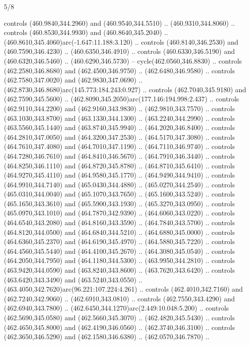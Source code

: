 \begin{flagdescription}{5/8}
\begin{scope}[xshift=0.5\flaglength,yshift=0.5\flagwidth,scale=\flagwidth/475.63]
\begin{scope}[y=0.8pt, x=0.8pt, yscale=-1, xscale=1,shift={(-450,-300)}]
\begin{scope}[cm={{1.0,0.0,0.0,1.0,(-0.0002,0.12556)}},cm={{1.0,0.0,0.0,1.0,(0.00179,0.0)}}]
\begin{scope}[cm={{1.01375,0.0,0.0,1.01375,(-5.36379,-4.94943)}}]
  controls (460.9840,344.2960) and (460.9540,344.5510) .. (460.9310,344.8060) ..
  controls (460.8530,344.9930) and (460.8640,345.2040) ..
  (460.8610,345.4060)arc(-1.647:11.188:3.120) .. controls (460.8140,346.2530)
  and (460.7590,346.4230) .. (460.6350,346.4910) .. controls (460.6330,346.5190)
  and (460.6320,346.5460) .. (460.6290,346.5730) -- cycle(462.0560,346.8830) ..
  controls (462.2580,346.8680) and (462.4500,346.9750) .. (462.6480,346.9580) ..
  controls (462.7580,347.0020) and (462.9830,347.0690) ..
  (462.8730,346.8680)arc(145.773:184.243:0.927) .. controls (462.7040,345.9180)
  and (462.7590,345.5600) .. (462.8090,345.2050)arc(177.146:194.998:2.437) ..
  controls (462.9110,344.2200) and (462.9160,343.9830) .. (462.9810,343.7570) ..
  controls (463.1030,343.8700) and (463.1330,344.1300) .. (463.2240,344.2990) ..
  controls (463.5560,345.1440) and (463.8740,345.9940) .. (464.2020,346.8400) ..
  controls (464.2810,347.0050) and (464.3200,347.2530) .. (464.5170,347.3080) ..
  controls (464.7610,347.4080) and (464.7010,347.1190) .. (464.7110,346.9740) ..
  controls (464.7280,346.7610) and (464.8410,346.5670) .. (464.7910,346.3440) ..
  controls (464.8250,346.1110) and (464.8720,345.8780) .. (464.8710,345.6410) ..
  controls (464.9270,345.4110) and (464.9580,345.1770) .. (464.9490,344.9410) ..
  controls (464.9910,344.7140) and (465.0430,344.4880) .. (465.0270,344.2540) ..
  controls (465.0310,344.0040) and (465.1070,343.7650) .. (465.1600,343.5240) ..
  controls (465.1650,343.3610) and (465.5900,343.1930) .. (465.3270,343.0950) ..
  controls (465.0970,343.1010) and (464.7870,342.9390) .. (464.6060,343.0220) ..
  controls (464.6540,343.2080) and (464.8160,343.3590) .. (464.7840,343.5700) ..
  controls (464.8120,344.0500) and (464.6840,344.5210) .. (464.6880,345.0000) ..
  controls (464.6360,345.2370) and (464.6190,345.4970) .. (464.5880,345.7220) ..
  controls (464.4560,345.5440) and (464.4100,345.2670) .. (464.3080,345.0540) ..
  controls (464.2050,344.7950) and (464.1180,344.5300) .. (463.9950,344.2810) ..
  controls (463.9420,344.0590) and (463.8240,343.8600) .. (463.7620,343.6420) ..
  controls (463.6420,343.3490) and (463.5240,343.0550) ..
  (463.4050,342.7620)arc(96.221:107.224:4.261) .. controls (462.4010,342.7160)
  and (462.7240,342.9060) .. (462.6910,343.0810) .. controls (462.7550,343.4290)
  and (462.6940,343.7800) .. (462.6450,344.1270)arc(2.449:10.048:5.200) ..
  controls (462.5690,345.0580) and (462.5660,345.3070) .. (462.4820,345.5430) ..
  controls (462.4650,345.8000) and (462.4190,346.0560) .. (462.3740,346.3100) ..
  controls (462.3650,346.5290) and (462.1580,346.6380) .. (462.0570,346.7870) ..

\end{scope}
\end{scope}
\end{scope}
\end{scope}
\end{flagdescription}
